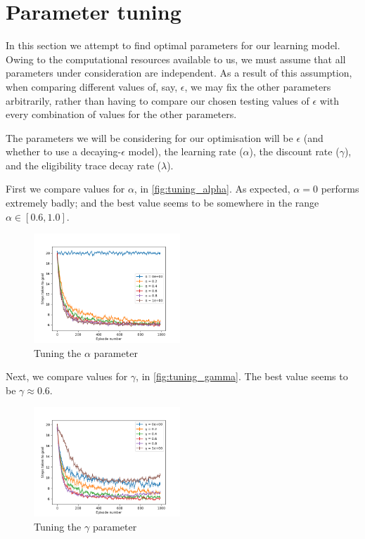 \documentclass[a4paper, 11pt, twocolumn, final]{article} %
\begin{document}
\section{Parameter tuning} In this section we attempt to find optimal parameters
for our learning model.  Owing to the computational resources available to us,
we must assume that all parameters under consideration are independent.  As a
result of this assumption, when comparing different values of, say, $\epsilon$,
we may fix the other parameters arbitrarily, rather than having to compare our
chosen testing values of $\epsilon$ with every combination of values for the
other parameters.

The parameters we will be considering for our optimisation will be $\epsilon$
(and whether to use a decaying-$\epsilon$ model), the learning rate ($\alpha$),
the discount rate ($\gamma$), and the eligibility trace decay rate ($\lambda$).

First we compare values for $\alpha$, in \autoref{fig:tuning_alpha}.  As
expected, $\alpha = 0$ performs extremely badly; and the best value seems to be
somewhere in the range $\alpha \in [0.6, 1.0]$.

\begin{figure}
  \includegraphics[width=0.49\textwidth]{figures/tuning_alpha.png}
  \caption{Tuning the $\alpha$ parameter}
  \label{fig:tuning_alpha}
\end{figure}

Next, we compare values for $\gamma$, in \autoref{fig:tuning_gamma}.  The best
value seems to be $\gamma \approx 0.6$.

\begin{figure}
  \includegraphics[width=0.49\textwidth]{figures/tuning_gamma.png}
  \caption{Tuning the $\gamma$ parameter}
  \label{fig:tuning_gamma}
\end{figure}
\end{document}
